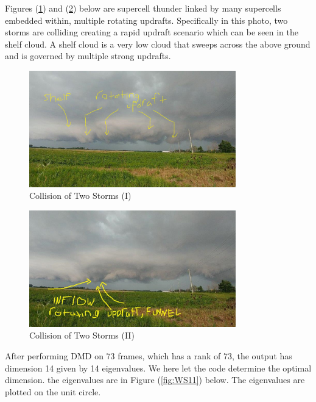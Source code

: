 \documentclass[12pt]{report}
\begin{document}
Figures (\ref{fig:WS9}) and (\ref{fig:WS10}) below are supercell thunder linked by many supercells embedded within, multiple rotating updrafts. Specifically in this photo, two storms are colliding creating a rapid updraft scenario which can be seen in the shelf cloud. A shelf cloud is a very low cloud that sweeps across the above ground and is governed by multiple strong updrafts.

\begin{figure}[H]
    \centering
    \includegraphics[width=0.8\textwidth]{Weather pics/WS9.jpg}
    \caption{Collision of Two Storms (I)} \label{fig:WS9}
\end{figure}
\noindent

\begin{figure}[H]
    \centering
    \includegraphics[width=0.8\textwidth]{Weather pics/WS10.jpg}
    \caption{Collision of Two Storms (II)} \label{fig:WS10}
\end{figure}
\noindent

After performing DMD on 73 frames, which has a rank of 73, the
output has dimension 14 given by 14 eigenvalues. We here let the code
determine the optimal dimension. the eigenvalues are in Figure (\ref{fig:WS11}) below. The eigenvalues are plotted on the unit circle.
\end{document}
